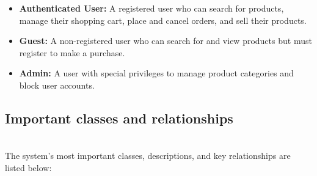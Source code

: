 \begin{itemize}
\item
\protect{}\label{Ck72s5ohn0OAhVaBNKVFh}
\textbf{Authenticated User:} A registered user who can search for products, manage their shopping cart, place and cancel orders, and sell their products.
\item
\protect{}\label{6c2lcYT1AUoWIYtbi5d5i}
\textbf{Guest:} A non-registered user who can search for and view products but must register to make a purchase.
\item
\protect{}\label{Arkj-0jNM0gjC5xem-h19}
\textbf{Admin:} A user with special privileges to manage product categories and block user accounts.
\end{itemize}

\subsection{Important classes and relationships}\label{fxuURlTI3yz_01ceaP4Gq}
\\
The system's most important classes, descriptions, and key relationships are listed below:

